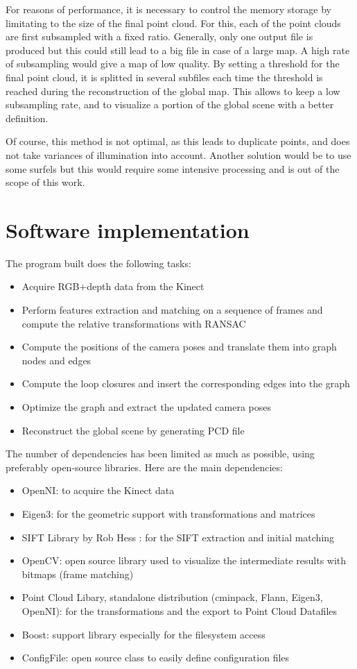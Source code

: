 For reasons of performance, it is necessary to control the memory storage by limitating to the size of the final point cloud. For this, each of the point clouds are first subsampled with a fixed ratio. Generally, only one output file is produced but this could still lead to a big file in case of a large map. A high rate of subsampling would give a map of low quality. By setting a threshold for the final point cloud, it is splitted in several subfiles each time the threshold is reached during the reconstruction of the global map. This allows to keep a low subsampling rate, and to visualize a portion of the global scene with a better definition.

Of course, this method is not optimal, as this leads to duplicate points, and does not take variances of illumination into account. Another solution would be to use some surfels \cite{IntelRGBD2010} but this would require some intensive processing and is out of the scope of this work.

\section{Software implementation}

The program built does the following tasks:
\begin{itemize}
\item Acquire RGB+depth data from the Kinect
\item Perform features extraction and matching on a sequence of frames and compute the relative transformations with RANSAC
\item Compute the positions of the camera poses and translate them into graph nodes and edges
\item Compute the loop closures and insert the corresponding edges into the graph
\item Optimize the graph and extract the updated camera poses
\item Reconstruct the global scene by generating PCD file
\end{itemize}

The number of dependencies has been limited as much as possible, using preferably open-source libraries.
Here are the main dependencies:
\begin{itemize}
\item OpenNI: to acquire the Kinect data
\item Eigen3: for the geometric support with transformations and matrices
\item SIFT Library by Rob Hess \cite{hesssift}: for the SIFT extraction and initial matching
\item OpenCV: open source library used to visualize the intermediate results with bitmaps (frame matching)
\item Point Cloud Libary, standalone distribution (cminpack, Flann, Eigen3, OpenNI): for the transformations and the export to Point Cloud Datafiles
\item Boost: support library especially for the filesystem access
\item ConfigFile: open source class to easily define configuration files
\end{itemize}

